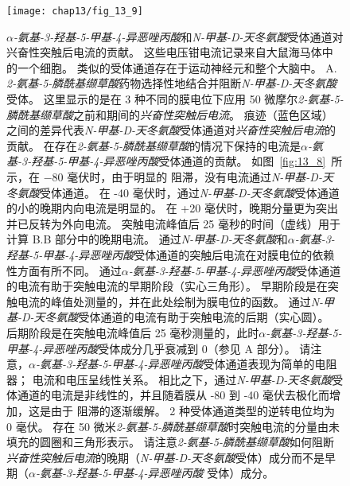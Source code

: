\begin{figure}[htbp]
	\centering
	\texttt{[image: chap13/fig\_13\_9]}
	\caption{\textit{$\alpha$-氨基-3-羟基-5-甲基-4-异恶唑丙酸}和\textit{N-甲基-D-天冬氨酸}受体通道对兴奋性突触后电流的贡献。
		这些电压钳电流记录来自大鼠海马体中的一个细胞。
		类似的受体通道存在于运动神经元和整个大脑中\cite{hestrin1990analysis}。
	A. \textit{2-氨基-5-膦酰基缬草酸}药物选择性地结合并阻断\textit{N-甲基-D-天冬氨酸}受体。
	这里显示的是在 3 种不同的膜电位下应用 50 微摩尔\textit{2-氨基-5-膦酰基缬草酸}之前和期间的\textit{兴奋性突触后电流}。
	痕迹（蓝色区域）之间的差异代表\textit{N-甲基-D-天冬氨酸}受体通道对\textit{兴奋性突触后电流}的贡献。
	在存在\textit{2-氨基-5-膦酰基缬草酸}的情况下保持的电流是\textit{$\alpha$-氨基-3-羟基-5-甲基-4-异恶唑丙酸}受体通道的贡献。
	如图~\ref{fig:13_8}~所示，在 −80 毫伏时，由于明显的  阻滞，没有电流通过\textit{N-甲基-D-天冬氨酸}受体通道。
	在 -40 毫伏时，通过\textit{N-甲基-D-天冬氨酸}受体通道的小的晚期内向电流是明显的。 
	在 +20 毫伏时，晚期分量更为突出并已反转为外向电流。
	突触电流峰值后 25 毫秒的时间（虚线）用于计算 B.B 部分中的晚期电流。
	通过\textit{N-甲基-D-天冬氨酸}和\textit{$\alpha$-氨基-3-羟基-5-甲基-4-异恶唑丙酸}受体通道的突触后电流在对膜电位的依赖性方面有所不同。
	通过\textit{$\alpha$-氨基-3-羟基-5-甲基-4-异恶唑丙酸}受体通道的电流有助于突触电流的早期阶段（实心三角形）。
	早期阶段是在突触电流的峰值处测量的，并在此处绘制为膜电位的函数。
	通过\textit{N-甲基-D-天冬氨酸}受体通道的电流有助于突触电流的后期（实心圆）。
	后期阶段是在突触电流峰值后 25 毫秒测量的，此时\textit{$\alpha$-氨基-3-羟基-5-甲基-4-异恶唑丙酸}受体成分几乎衰减到 0（参见 A 部分）。
	请注意，\textit{$\alpha$-氨基-3-羟基-5-甲基-4-异恶唑丙酸}受体通道表现为简单的电阻器；
	电流和电压呈线性关系。
	相比之下，通过\textit{N-甲基-D-天冬氨酸}受体通道的电流是非线性的，并且随着膜从 -80 到 -40 毫伏去极化而增加，这是由于  阻滞的逐渐缓解。
	2 种受体通道类型的逆转电位均为 0 毫伏。
	存在 50 微米\textit{2-氨基-5-膦酰基缬草酸}时突触电流的分量由未填充的圆圈和三角形表示。
	请注意\textit{2-氨基-5-膦酰基缬草酸}如何阻断\textit{兴奋性突触后电流}的晚期（\textit{N-甲基-D-天冬氨酸}受体）成分而不是早期（\textit{$\alpha$-氨基-3-羟基-5-甲基-4-异恶唑丙酸} 受体）成分。}
	\label{fig:13_9}
\end{figure}


